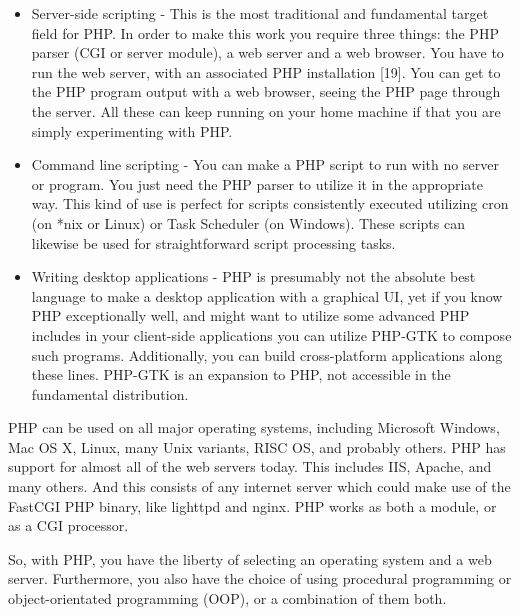\documentclass[../thesis.tex]{subfiles}
\begin{document}
\begin{itemize}
\item Server-side scripting -  This is the most traditional and fundamental target field for PHP. In order to make this work you require three things: the PHP parser (CGI or server module), a web server and a web browser. You have to run the web server, with an associated PHP installation [19]. You can get to the PHP program output with a web browser, seeing the PHP page through the server. All these can keep running on your home machine if that you are simply experimenting with PHP.
\newline
    
\item Command line scripting - You can make a PHP script to run with no server or program. You just need the PHP parser to utilize it in the appropriate way. This kind of use is perfect for scripts consistently executed utilizing cron (on *nix or Linux) or Task Scheduler (on Windows). These scripts can likewise be used for straightforward script processing tasks.
\newline
    
\item Writing desktop applications - PHP is presumably not the absolute best language to make a desktop application with a graphical UI, yet if you know PHP exceptionally well, and might want to utilize some advanced PHP includes in your client-side applications you can utilize PHP-GTK to compose such programs. Additionally, you can build cross-platform applications along these lines. PHP-GTK is an expansion to PHP, not accessible in the fundamental distribution.
\end{itemize}
    
PHP can be used on all major operating systems, including Microsoft Windows, Mac OS X, Linux, many Unix variants, RISC OS, and probably others. PHP has support for almost all of the web servers today. This includes IIS, Apache, and many others. And this consists of any internet server which could make use of the FastCGI PHP binary, like lighttpd and nginx. PHP works as both a module, or as a CGI processor.
\newline
    
So, with PHP, you have the liberty of selecting an operating system and a web server. Furthermore, you also have the choice of using procedural programming or object-orientated programming (OOP), or a combination of them both.
\newline
    
\end{document}

